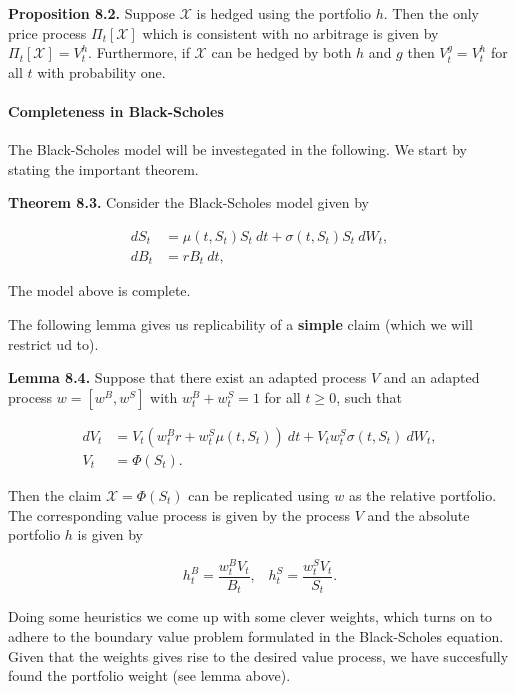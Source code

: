 \documentclass[
]{article}
\begin{document}
\textbf{Proposition 8.2.} Suppose \(\mathcal{X}\) is hedged using the
portfolio \(h\). Then the only price process \(\Pi_t[\mathcal{X}]\)
which is consistent with no arbitrage is given by
\(\Pi_t[\mathcal{X}]=V_t^h\). Furthermore, if \(\mathcal{X}\) can be
hedged by both \(h\) and \(g\) then \(V_t^g=V_t^h\) for all \(t\) with
probability one.

\hypertarget{completeness-in-black-scholes}{%
\paragraph{Completeness in
Black-Scholes}\label{completeness-in-black-scholes}}

The Black-Scholes model will be investegated in the following. We start
by stating the important theorem.

\textbf{Theorem 8.3.} Consider the Black-Scholes model given by

\begin{align*}
dS_t&=\mu(t,S_t) S_t\ dt+\sigma(t,S_t) S_t\ dW_t,\tag{8.2}\\
dB_t&=r B_t\ dt,\tag{8.3}
\end{align*}

The model above is complete.

The following lemma gives us replicability of a \textbf{simple} claim
(which we will restrict ud to).

\textbf{Lemma 8.4.} Suppose that there exist an adapted process \(V\)
and an adapted process \(w=[w^B,w^S]\) with \(w^B_t+w^S_t=1\) for all
\(t\ge 0\), such that

\begin{align*}
dV_t&=V_t(w_t^Br+w_t^S\mu(t,S_t))\ dt+V_tw_t^S\sigma(t,S_t)\ dW_t,\\
V_t&=\Phi(S_t).
\end{align*}

Then the claim \(\mathcal{X}=\Phi(S_t)\) can be replicated using \(w\)
as the relative portfolio. The corresponding value process is given by
the process \(V\) and the absolute portfolio \(h\) is given by

\[
h_t^B=\frac{w_t^B V_t}{B_t},\hspace{10pt} h_t^S=\frac{w_t^S V_t}{S_t}.
\]

Doing some heuristics we come up with some clever weights, which turns
on to adhere to the boundary value problem formulated in the
Black-Scholes equation. Given that the weights gives rise to the desired
value process, we have succesfully found the portfolio weight (see lemma
above).
\end{document}
